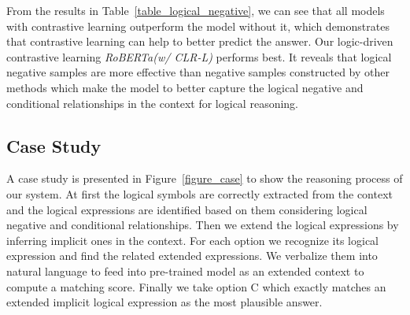 \documentclass[11pt,a4paper]{article}
\begin{document}
From the results in Table~\ref{table_logical_negative}, we can see that all models with contrastive learning outperform the model without it, which demonstrates that contrastive learning can help to better predict the answer. Our logic-driven contrastive learning \emph{RoBERTa(w/ CLR-L)} performs best. It reveals that logical negative samples are more effective than negative samples constructed by other methods which make the model to better capture the logical negative and conditional relationships in the context for logical reasoning.






\subsection{Case Study}
A case study is presented in Figure~\ref{figure_case} to show the reasoning process of our system. At first the logical symbols are correctly extracted from the context and the logical expressions are identified based on them considering logical negative and conditional relationships. Then we extend the logical expressions by inferring implicit ones in the context. For each option we recognize its logical expression and find the related extended expressions. We verbalize them into natural language to feed into pre-trained model as an extended context to compute a matching score. Finally we take option C which exactly matches an extended implicit logical expression as the most plausible answer. 
\end{document}
